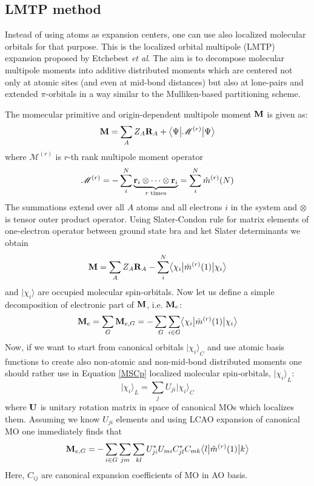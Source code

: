 \documentclass[a4paper,titlepage,twoside,fleqn,12pt]{book}
\newcommand{\ket}[1]{\ensuremath{\bigr\rvert {#1} \bigr\rangle}}
\newcommand{\tbraket}[3]{\ensuremath{\bigl\langle {#1} \bigl\lvert {#2} \bigl\lvert {#3} \bigr\rangle}}
\begin{document}
\begin{appendices}
\begin{refsection}
\section{LMTP method}

Instead of using atoms as expansion centers, one can use also localized molecular orbitals
for that purpose. This is the localized orbital multipole (LMTP) expansion 
proposed by Etchebest \emph{et al}.\citep{Etchebest.Lavery.Pullman.TheorChimActa.1982}
The aim is to decompose molecular multipole moments into additive
distributed moments which are centered not only at atomic sites
(and even at mid\hyp{}bond distances) but also at lone\hyp{}pairs 
and extended $\pi$\hyp{}orbitals in a way similar to the Mulliken\hyp{}based
partitioning scheme.

The momecular primitive and origin\hyp{}dependent multipole moment $\bf M$
is given as:
%
\begin{equation}\label{M}
{\bf M} = \sum_A Z_A{\bf R}_A + \tbraket{\Psi}{\mathscr{M}^{(r)}}{\Psi}
\end{equation}
%
where $\mathscr{M}^{(r)}$ is $r$-th rank multipole moment operator
%
\begin{equation}\label{Mop}
\mathscr{M}^{(r)} = -\sum_i^N \underbrace{{\bf r}_i \otimes \cdots \otimes {\bf r}_i }_{r \; {\rm times}} = \sum_i^N \hat{m}^{(r)}(N)
\end{equation}
%
The summations extend over all $A$ atoms and all electrons $i$ in the system
and $\otimes$ is tensor outer product operator.
Using Slater\hyp{}Condon rule for matrix elements of one\hyp{}electron operator
between ground state bra and ket Slater determinants we obtain
%
\begin{equation}\label{MSC}
{\bf M} = \sum_A Z_A{\bf R}_A - \sum_i^N \tbraket{\chi_i}{\hat{m}^{(r)}(1)}{\chi_i}
\end{equation}
%
and $\ket{\chi_i}$ are occupied molecular spin\hyp{}orbitals.
Now let us define a simple decomposition of electronic part of $\bf M$, i.e. ${\bf M}_e$:
%
\begin{equation}\label{MSCp}
{\bf M}_e = \sum_G {\bf M}_{e,G} =  -\sum_G\sum_{i \in G} \tbraket{\chi_i}{\hat{m}^{(r)}(1)}{\chi_i}
\end{equation}
%
Now, if we want to start from canonical orbitals $\ket{\chi_i}_C$ and use atomic basis functions to create also
non\hyp{}atomic and non\hyp{}mid\hyp{}bond distributed moments one should rather use in Equation \eqref{MSCp} localized
molecular spin\hyp{}orbitals, $\ket{\chi_i}_L$:
%
\begin{equation}\label{a}
\ket{\chi_i}_L = \sum_j U_{ji} \ket{\chi_i}_C
\end{equation}
%
where $\bf U$ is unitary rotation matrix in space of canonical MOs which localizes them. Assuming we know
$U_{ji}$ elements and using LCAO expansion of canonical MO one immediately finds that
%
\begin{equation}\label{b}
{\bf M}_{e,G} = -\sum_{i \in G} \sum_{jm} \sum_{kl} U^*_{ji} U_{mi} C^*_{jl} C_{mk} \tbraket{l}{\hat{m}^{(r)}(1)}{k}
\end{equation}
%
Here, $C_{ij}$ are canonical expansion coefficients of MO in AO basis.


\end{refsection}
\end{appendices}
\end{document}

